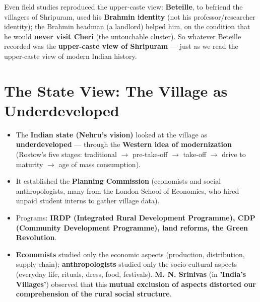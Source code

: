 \begin{CriticalPoint}
Even field studies reproduced the upper-caste view: \textbf{Beteille}, to befriend the villagers of Shripuram, used his \textbf{Brahmin identity} (not his professor/researcher identity); the Brahmin headman (a landlord) helped him, on the condition that he would \textbf{never visit Cheri} (the untouchable cluster). So whatever Beteille recorded was the \textbf{upper-caste view of Shripuram} --- just as we read the upper-caste view of modern Indian history.
\end{CriticalPoint}

\section{The State View: The Village as Underdeveloped}

\begin{KeyConcept}
\begin{itemize}
\item The \textbf{Indian state (Nehru's vision)} looked at the village as \textbf{underdeveloped} --- through the \textbf{Western idea of modernization} (Rostow's five stages: traditional $\rightarrow$ pre-take-off $\rightarrow$ take-off $\rightarrow$ drive to maturity $\rightarrow$ age of mass consumption).
\item It established the \textbf{Planning Commission} (economists and social anthropologists, many from the London School of Economics, who hired unpaid student interns to gather village data).
\item Programs: \textbf{IRDP (Integrated Rural Development Programme), CDP (Community Development Programme), land reforms, the Green Revolution}.
\item \textbf{Economists} studied only the economic aspects (production, distribution, supply chain); \textbf{anthropologists} studied only the socio-cultural aspects (everyday life, rituals, dress, food, festivals). \textbf{M. N. Srinivas} (in \textbf{'India's Villages'}) observed that this \textbf{mutual exclusion of aspects distorted our comprehension of the rural social structure}.
\end{itemize}
\end{KeyConcept}

